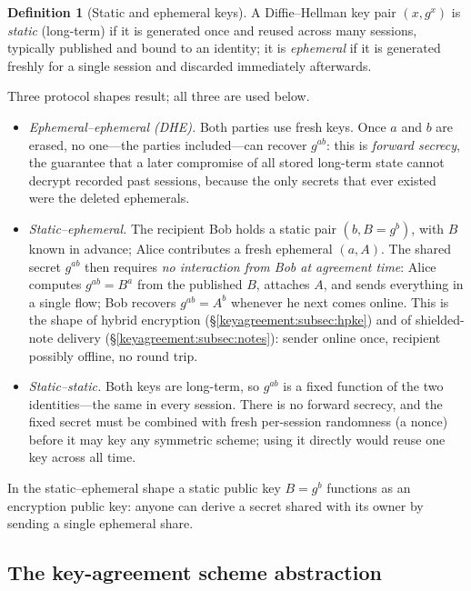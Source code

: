 \documentclass[11pt,a4paper]{article}
\theoremstyle{definition}
\newtheorem{definition}[theorem]{Definition}
\theoremstyle{remark}
\begin{document}
\begin{definition}[Static and ephemeral keys]
\label{keyagreement:def:static}
A Diffie--Hellman key pair \((x, g^{x})\) is \emph{static}
(long-term) if it is generated once and reused across many sessions,
typically published and bound to an identity; it is \emph{ephemeral}
if it is generated freshly for a single session and discarded
immediately afterwards.
\end{definition}

Three protocol shapes result; all three are used below.

\begin{itemize}
\item \emph{Ephemeral--ephemeral (DHE).} Both parties use fresh
  keys. Once \(a\) and \(b\) are erased, no one---the parties
  included---can recover \(g^{ab}\): this is \emph{forward secrecy},
  the guarantee that a later compromise of all stored long-term state
  cannot decrypt recorded past sessions, because the only secrets
  that ever existed were the deleted ephemerals.
\item \emph{Static--ephemeral.} The recipient Bob holds a static pair
  \((b, B = g^{b})\), with \(B\) known in advance; Alice contributes
  a fresh ephemeral \((a, A)\). The shared secret \(g^{ab}\) then
  requires \emph{no interaction from Bob at agreement time}: Alice
  computes \(g^{ab} = B^{a}\) from the published \(B\), attaches
  \(A\), and sends everything in a single flow; Bob recovers
  \(g^{ab} = A^{b}\) whenever he next comes online. This is the shape
  of hybrid encryption
  (\S\ref{keyagreement:subsec:hpke}) and of shielded-note delivery
  (\S\ref{keyagreement:subsec:notes}): sender online once, recipient
  possibly offline, no round trip.
\item \emph{Static--static.} Both keys are long-term, so \(g^{ab}\)
  is a fixed function of the two identities---the same in every
  session. There is no forward secrecy, and the fixed secret
  must be combined with fresh per-session randomness (a nonce) before
  it may key any symmetric scheme; using it directly would reuse one
  key across all time.
\end{itemize}

In the static--ephemeral shape a static public key \(B = g^{b}\)
functions as an encryption public key: anyone can derive a secret
shared with its owner by sending a single ephemeral share.

\subsection{The key-agreement scheme abstraction}
\label{keyagreement:subsec:abstraction}
\end{document}
